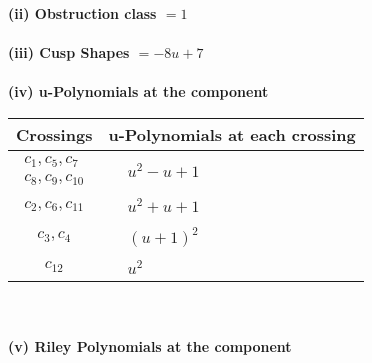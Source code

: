 \documentclass[1p]{elsarticle_modified}
\theoremstyle{definition}
\begin{document}
\flushleft \textbf{(ii) Obstruction class $= 1$}\\~\\
\flushleft \textbf{(iii) Cusp Shapes $= -8 u+7$}\\~\\
\newpage\renewcommand{\arraystretch}{1}
\flushleft \textbf{(iv) u-Polynomials at the component}\newline \\
\begin{tabular}{m{50pt}|m{274pt}}
Crossings & \hspace{64pt}u-Polynomials at each crossing \\
\hline $$\begin{aligned}c_{1},c_{5},c_{7}\\c_{8},c_{9},c_{10}\end{aligned}$$&$\begin{aligned}
&u^2- u+1
\end{aligned}$\\
\hline $$\begin{aligned}c_{2},c_{6},c_{11}\end{aligned}$$&$\begin{aligned}
&u^2+u+1
\end{aligned}$\\
\hline $$\begin{aligned}c_{3},c_{4}\end{aligned}$$&$\begin{aligned}
&(u+1)^2
\end{aligned}$\\
\hline $$\begin{aligned}c_{12}\end{aligned}$$&$\begin{aligned}
&u^2
\end{aligned}$\\
\hline
\end{tabular}\\~\\
\newpage\renewcommand{\arraystretch}{1}
\flushleft \textbf{(v) Riley Polynomials at the component}\newline \\
\end{document}
